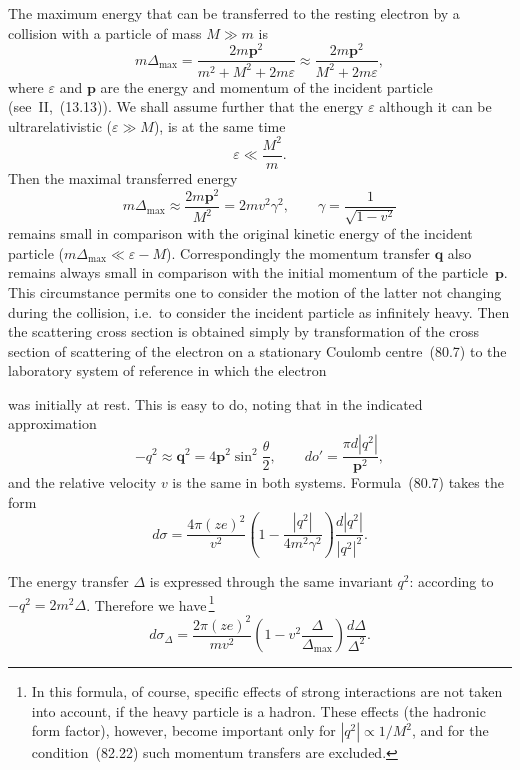 The maximum energy that can be transferred to the resting electron by a collision with a particle of mass $M \gg m$ is
\begin{equation}
m\Delta_\text{max} = \frac{2m\mathbf{p}^2}{m^2 + M^2 + 2m\varepsilon} \approx \frac{2m\mathbf{p}^2}{M^2 + 2m\varepsilon},
\tag{82.22}
\end{equation}
where $\varepsilon$ and $\mathbf{p}$ are the energy and momentum of the incident particle (see~II,~(13.13)). We shall assume further that the energy $\varepsilon$ although it can be ultrarelativistic ($\varepsilon \gg M$), is at the same time
\begin{equation}
\varepsilon \ll \frac{M^2}{m}.
\tag{82.23}
\end{equation}
Then the maximal transferred energy
\begin{equation}
m\Delta_\text{max} \approx \frac{2m\mathbf{p}^2}{M^2} = 2mv^2\gamma^2,\qquad \gamma = \frac{1}{\sqrt{1-v^2}}
\tag{82.24}
\end{equation}
remains small in comparison with the original kinetic energy of the incident particle ($m\Delta_\text{max} \ll \varepsilon - M$). Correspondingly the momentum transfer $\mathbf{q}$ also remains always small in comparison with the initial momentum of the particle~$\mathbf{p}$. This circumstance permits one to consider the motion of the latter not changing during the collision, i.e.\ to consider the incident particle as infinitely heavy. Then the scattering cross section is obtained simply by transformation of the cross section of scattering of the electron on a stationary Coulomb centre~(80.7) to the laboratory system of reference in which the electron

was initially at rest. This is easy to do, noting that in the indicated approximation
\[
-q^2 \approx \mathbf{q}^2 = 4\mathbf{p}^2\sin^2\frac{\theta}{2},\qquad do' = \frac{\pi d|q^2|}{\mathbf{p}^2},
\]
and the relative velocity $v$ is the same in both systems. Formula~(80.7) takes the form
\[
d\sigma = \frac{4\pi(ze)^2}{v^2}\left(1 - \frac{|q^2|}{4m^2\gamma^2}\right)\frac{d|q^2|}{|q^2|^2}.
\]

The energy transfer $\Delta$ is expressed through the same invariant $q^2$: according to~$-q^2 = 2m^2\Delta$. Therefore we have\,\footnote{In this formula, of course, specific effects of strong interactions are not taken into account, if the heavy particle is a hadron. These effects (the hadronic form factor), however, become important only for $|q^2| \propto 1/M^2$, and for the condition~(82.22) such momentum transfers are excluded.}
\begin{equation}
d\sigma_\Delta = \frac{2\pi(ze)^2}{mv^2}\left(1 - v^2\frac{\Delta}{\Delta_\text{max}}\right)\frac{d\Delta}{\Delta^2}.
\tag{82.25}
\end{equation}

